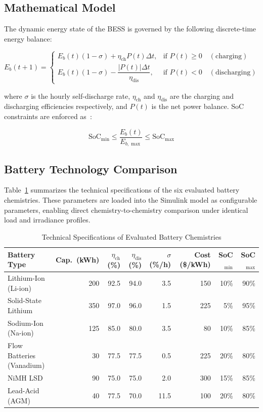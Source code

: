 \documentclass[journal]{IEEEtran}
\begin{document}
\subsection{Mathematical Model}

The dynamic energy state of the BESS is governed by the following discrete-time energy balance:~\cite{liu2022}

\begin{equation}
E_b(t+1) = \begin{cases}
E_b(t)(1-\sigma) + \eta_{\text{ch}} P(t) \Delta t, & \text{if } P(t) \geq 0 \quad (\text{charging}) \\[4pt]
E_b(t)(1-\sigma) - \dfrac{|P(t)|\Delta t}{\eta_{\text{dis}}}, & \text{if } P(t) < 0 \quad (\text{discharging})
\end{cases}
\label{eq:bess}
\end{equation}

where $\sigma$ is the hourly self-discharge rate, $\eta_{\text{ch}}$ and $\eta_{\text{dis}}$ are the charging and discharging efficiencies respectively, and $P(t)$ is the net power balance. SoC constraints are enforced as~\cite{liu2022}:

\begin{equation}
\text{SoC}_{\min} \leq \frac{E_b(t)}{E_{b,\max}} \leq \text{SoC}_{\max}
\label{eq:soc}
\end{equation}

\subsection{Battery Technology Comparison}

Table~\ref{tab:bess_tech} summarizes the technical specifications of the six evaluated battery chemistries. These parameters are loaded into the Simulink model as configurable parameters, enabling direct chemistry-to-chemistry comparison under identical load and irradiance profiles.

\begin{table}[!t]
\centering
\caption{Technical Specifications of Evaluated Battery Chemistries}
\label{tab:bess_tech}
\begin{tabular}{lrrrrrrr}
\toprule
\textbf{Battery Type} & \textbf{Cap.\ (kWh)} & \textbf{$\eta_{\text{ch}}$ (\%)} & \textbf{$\eta_{\text{dis}}$ (\%)} & \textbf{$\sigma$ (\%/h)} & \textbf{Cost (\$/kWh)} & \textbf{SoC$_{\min}$} & \textbf{SoC$_{\max}$} \\
\midrule
Lithium-Ion (Li-ion)    & 200 & 92.5 & 94.0 & 3.5  & 150 & 10\% & 90\% \\
Solid-State Lithium     & 350 & 97.0 & 96.0 & 1.5  & 225 & 5\%  & 95\% \\
Sodium-Ion (Na-ion)     & 125 & 85.0 & 80.0 & 3.5  & 80  & 10\% & 85\% \\
Flow Batteries (Vanadium) & 30 & 77.5 & 77.5 & 0.5 & 225 & 20\% & 80\% \\
NiMH LSD                & 90  & 75.0 & 75.0 & 2.0  & 300 & 15\% & 85\% \\
Lead-Acid (AGM)         & 40  & 77.5 & 70.0 & 11.5 & 100 & 20\% & 80\% \\
\bottomrule
\end{tabular}
\end{table}
\end{document}
